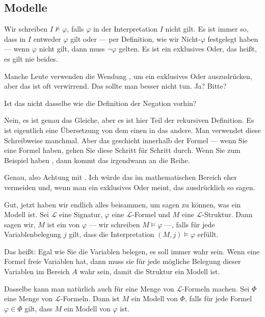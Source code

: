 \subsection{Modelle}

\begin{spoken-clean}[01:15:07 - 01:17:32]
Wir schreiben $I \not\models \varphi$, falls $\varphi$ in der Interpretation $I$ nicht gilt. Es ist immer so, dass in $I$ entweder $\varphi$ gilt oder --- per Definition, wie wir Nicht-$\varphi$ festgelegt haben --- wenn $\varphi$ nicht gilt, dann muss $\neg \varphi$ gelten. Es ist ein exklusives Oder, das heißt, es gilt nie beides.

Manche Leute verwenden die Wendung , um ein exklusives Oder auszudrücken, aber das ist oft verwirrend. Das sollte man besser nicht tun. Ja? Bitte?
\end{spoken-clean}

\begin{student-interaction}[Studentenfrage]
Ist das nicht dasselbe wie die Definition der Negation vorhin?
\end{student-interaction}

\begin{spoken-clean}[continued]
Nein, es ist genau das Gleiche, aber es ist hier Teil der rekursiven Definition. Es ist eigentlich eine Übersetzung von dem einen in das andere. Man verwendet diese Schreibweise manchmal. Aber das geschieht innerhalb der Formel --- wenn Sie eine Formel haben, gehen Sie diese Schritt für Schritt durch. Wenn Sie zum Beispiel haben , dann kommt das irgendwann an die Reihe.

Genau, also Achtung mit . Ich würde das im mathematischen Bereich eher vermeiden und, wenn man ein exklusives Oder meint, das ausdrücklich so sagen.
\end{spoken-clean}

\begin{spoken-clean}[01:17:32 - 01:20:07]
Gut, jetzt haben wir endlich alles beisammen, um sagen zu können, was ein Modell ist. Sei $\mathcal{L}$ eine Signatur, $\varphi$ eine $\mathcal{L}$-Formel und $M$ eine $\mathcal{L}$-Struktur. Dann sagen wir, $M$ ist ein  von $\varphi$ --- wir schreiben $M \models \varphi$ ---, falls für jede Variablenbelegung $j$ gilt, dass die Interpretation $(M, j) \models \varphi$ erfüllt.

Das heißt: Egal wie Sie die Variablen belegen, es soll immer wahr sein. Wenn eine Formel freie Variablen hat, dann muss sie für jede mögliche Belegung dieser Variablen im Bereich $A$ wahr sein, damit die Struktur ein Modell ist.

Dasselbe kann man natürlich auch für eine Menge von $\mathcal{L}$-Formeln machen. Sei $\Phi$ eine Menge von $\mathcal{L}$-Formeln. Dann ist $M$ ein Modell von $\Phi$, falls für jede Formel $\varphi \in \Phi$ gilt, dass $M$ ein Modell von $\varphi$ ist.
\end{spoken-clean}

